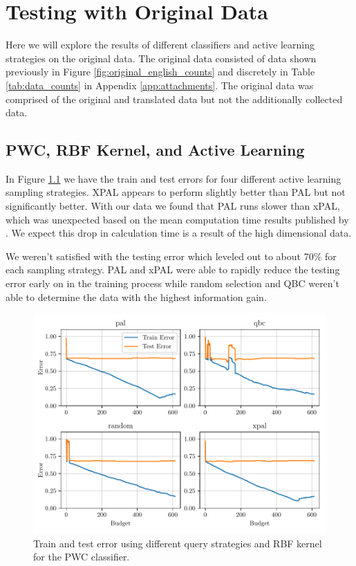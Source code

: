 \chapter{Testing with Original Data}

Here we will explore the results of different classifiers and active learning strategies on the original data. The original data consisted of data shown previously in Figure \ref{fig:original_english_counts} and discretely in Table \ref{tab:data_counts} in Appendix \ref{app:attachments}. The original data was comprised of the original and translated data but not the additionally collected data. 

\section{PWC, RBF Kernel, and Active Learning}

In Figure \ref{fig:plot_all_results_rbf} we have the train and test errors for four different active learning sampling strategies. XPAL appears to perform slightly better than PAL but not significantly better. With our data we found that PAL runs slower than xPAL, which was unexpected based on the mean computation time results published by \cite{kottke2021toward}. We expect this drop in calculation time is a result of the high dimensional data.

We weren't satisfied with the testing error which leveled out to about 70\% for each sampling strategy. PAL and xPAL were able to rapidly reduce the testing error early on in the training process while random selection and QBC weren't able to determine the data with the highest information gain. 

\begin{figure}[ht]
  \centering
  \includegraphics[width=\scale\textwidth]{../img/plot_all_results_rbf.pdf}
  \caption{Train and test error using different query strategies and RBF kernel for the PWC classifier.}
  \label{fig:plot_all_results_rbf}
\end{figure}

